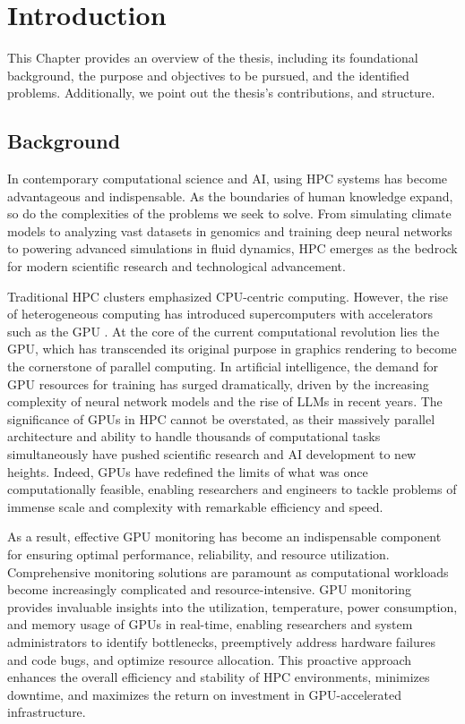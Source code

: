 \chapter{Introduction}
\label{chap:introduction}
This Chapter provides an overview of the thesis, including its foundational background, the purpose and objectives to be pursued, and the identified problems. Additionally, we point out the thesis's contributions, and structure.

\section{Background}
In contemporary computational science and AI, using HPC systems has become advantageous and indispensable. As the boundaries of human knowledge expand, so do the complexities of the problems we seek to solve. From simulating climate models to analyzing vast datasets in genomics and training deep neural networks to powering advanced simulations in fluid dynamics, HPC emerges as the bedrock for modern scientific research and technological advancement.

Traditional HPC clusters emphasized CPU-centric computing. However, the rise of heterogeneous computing has introduced supercomputers with accelerators such as the GPU \cite{5289128}. At the core of the current computational revolution lies the GPU, which has transcended its original purpose in graphics rendering to become the cornerstone of parallel computing. In artificial intelligence, the demand for GPU resources for training has surged dramatically, driven by the increasing complexity of neural network models and the rise of LLMs in recent years. The significance of GPUs in HPC cannot be overstated, as their massively parallel architecture and ability to handle thousands of computational tasks simultaneously have pushed scientific research and AI development to new heights. Indeed, GPUs have redefined the limits of what was once computationally feasible, enabling researchers and engineers to tackle problems of immense scale and complexity with remarkable efficiency and speed.

As a result, effective GPU monitoring has become an indispensable component for ensuring optimal performance, reliability, and resource utilization. Comprehensive monitoring solutions are paramount as computational workloads become increasingly complicated and resource-intensive. GPU monitoring provides invaluable insights into the utilization, temperature, power consumption, and memory usage of GPUs in real-time, enabling researchers and system administrators to identify bottlenecks, preemptively address hardware failures and code bugs, and optimize resource allocation. This proactive approach enhances the overall efficiency and stability of HPC environments, minimizes downtime, and maximizes the return on investment in GPU-accelerated infrastructure.

